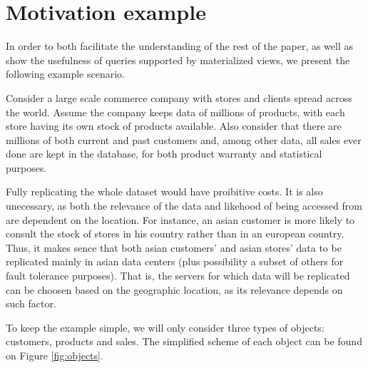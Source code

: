 \documentclass{vldb}
\begin{document}

\section{Motivation example}
\label{sec:example}


In order to both facilitate the understanding of the rest of the paper, as well as show the usefulness of queries supported by materialized views, we present the following example scenario.

Consider a large scale commerce company with stores and clients spread across the world.
Assume the company keeps data of millions of products, with each store having its own stock of products available.
Also consider that there are millions of both current and past customers and, among other data, all sales ever done are kept in the database, for both product warranty and statistical purposes.

Fully replicating the whole dataset would have proibitive costs.
It is also unecessary, as both the relevance of the data and likehood of being accessed from are dependent on the location.
For instance, an asian customer is more likely to consult the stock of stores in his country rather than in an european country.
Thus, it makes sence that both asian customers' and asian stores' data to be replicated mainly in asian data centers (plus possibility a subset of others for fault tolerance purposes).
That is, the servers for which data will be replicated can be choosen based on the geographic location, as its relevance depends on such factor.

To keep the example simple, we will only consider three types of objects: customers, products and sales.
The simplified scheme of each object can be found on Figure \ref{fig:objects}.
\end{document}
